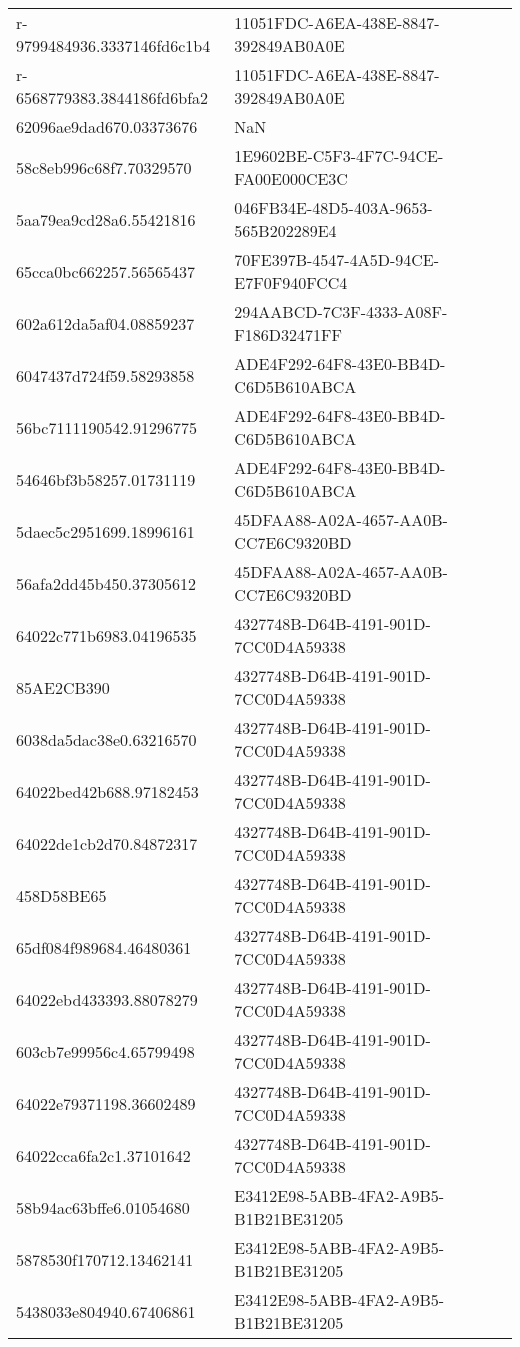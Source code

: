 \begin{tabular}{ll}
r-9799484936.3337146fd6c1b4 & 11051FDC-A6EA-438E-8847-392849AB0A0E \\
r-6568779383.3844186fd6bfa2 & 11051FDC-A6EA-438E-8847-392849AB0A0E \\
62096ae9dad670.03373676 & NaN \\
58c8eb996c68f7.70329570 & 1E9602BE-C5F3-4F7C-94CE-FA00E000CE3C \\
5aa79ea9cd28a6.55421816 & 046FB34E-48D5-403A-9653-565B202289E4 \\
65cca0bc662257.56565437 & 70FE397B-4547-4A5D-94CE-E7F0F940FCC4 \\
602a612da5af04.08859237 & 294AABCD-7C3F-4333-A08F-F186D32471FF \\
6047437d724f59.58293858 & ADE4F292-64F8-43E0-BB4D-C6D5B610ABCA \\
56bc7111190542.91296775 & ADE4F292-64F8-43E0-BB4D-C6D5B610ABCA \\
54646bf3b58257.01731119 & ADE4F292-64F8-43E0-BB4D-C6D5B610ABCA \\
5daec5c2951699.18996161 & 45DFAA88-A02A-4657-AA0B-CC7E6C9320BD \\
56afa2dd45b450.37305612 & 45DFAA88-A02A-4657-AA0B-CC7E6C9320BD \\
64022c771b6983.04196535 & 4327748B-D64B-4191-901D-7CC0D4A59338 \\
85AE2CB390 & 4327748B-D64B-4191-901D-7CC0D4A59338 \\
6038da5dac38e0.63216570 & 4327748B-D64B-4191-901D-7CC0D4A59338 \\
64022bed42b688.97182453 & 4327748B-D64B-4191-901D-7CC0D4A59338 \\
64022de1cb2d70.84872317 & 4327748B-D64B-4191-901D-7CC0D4A59338 \\
458D58BE65 & 4327748B-D64B-4191-901D-7CC0D4A59338 \\
65df084f989684.46480361 & 4327748B-D64B-4191-901D-7CC0D4A59338 \\
64022ebd433393.88078279 & 4327748B-D64B-4191-901D-7CC0D4A59338 \\
603cb7e99956c4.65799498 & 4327748B-D64B-4191-901D-7CC0D4A59338 \\
64022e79371198.36602489 & 4327748B-D64B-4191-901D-7CC0D4A59338 \\
64022cca6fa2c1.37101642 & 4327748B-D64B-4191-901D-7CC0D4A59338 \\
58b94ac63bffe6.01054680 & E3412E98-5ABB-4FA2-A9B5-B1B21BE31205 \\
5878530f170712.13462141 & E3412E98-5ABB-4FA2-A9B5-B1B21BE31205 \\
5438033e804940.67406861 & E3412E98-5ABB-4FA2-A9B5-B1B21BE31205 \\

\end{tabular}

